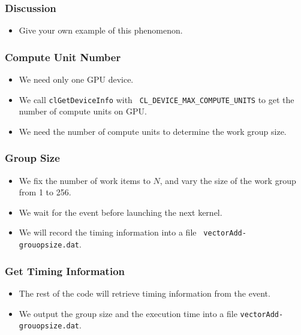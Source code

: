 \documentclass{beamer}
\begin{document}
\begin{frame}
  \frametitle{Discussion}
  \begin{itemize}
    \item Give your own example of this phenomenon.
  \end{itemize}
\end{frame}

\begin{frame}
  \frametitle{Compute Unit Number}
  \begin{itemize}
    \item We need only one GPU device.
    \item We call {\tt clGetDeviceInfo} with {\tt
      CL\_DEVICE\_MAX\_COMPUTE\_UNITS} to get the number of compute
      units on GPU.
    \item We need the number of compute units to determine the work
      group size.
  \end{itemize}
\end{frame}

\begin{frame}
\end{frame}


\begin{frame}
  \frametitle{Group Size}
  \begin{itemize}
    \item We fix the number of work items to $N$, and vary the size of
      the work group from 1 to 256.
    \item We wait for the event before launching the next kernel.
    \item We will record the timing information into a file {\tt
      vectorAdd-grouopsize.dat}.
  \end{itemize}
\end{frame}

\begin{frame}
\end{frame}

\begin{frame}
  \frametitle{Get Timing Information}
  \begin{itemize}
    \item The rest of the code will retrieve timing information from
      the event.
    \item We output the group size and the execution time into a file
      {\tt vectorAdd-grouopsize.dat}.
  \end{itemize}
\end{frame}
\end{document}
